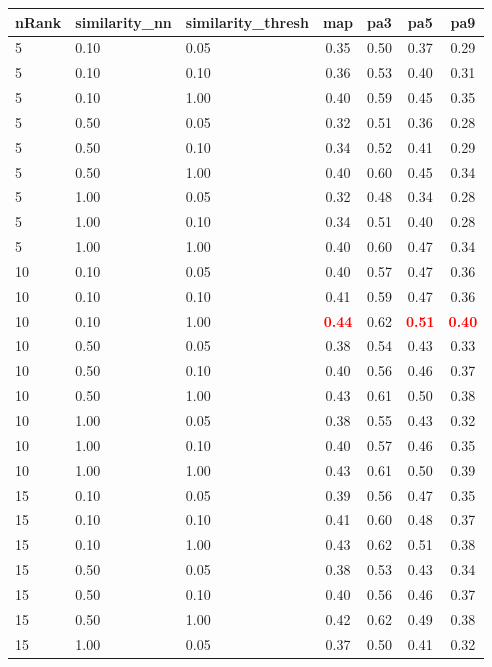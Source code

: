   
\begin{table} 
\begin{center} 
\scriptsize 
 \setlength{\tabcolsep}{.16667em} 
\begin{tabular}{lllcccc} 
nRank & similarity\_nn & similarity\_thresh & map & pa3 & pa5 & pa9 \\ 
\hline 
 5 & 0.10 & 0.05 & 0.35 & 0.50 & 0.37 & 0.29 \\ 
 5 & 0.10 & 0.10 & 0.36 & 0.53 & 0.40 & 0.31 \\ 
 5 & 0.10 & 1.00 & 0.40 & 0.59 & 0.45 & 0.35 \\ 
 5 & 0.50 & 0.05 & 0.32 & 0.51 & 0.36 & 0.28 \\ 
 5 & 0.50 & 0.10 & 0.34 & 0.52 & 0.41 & 0.29 \\ 
 5 & 0.50 & 1.00 & 0.40 & 0.60 & 0.45 & 0.34 \\ 
 5 & 1.00 & 0.05 & 0.32 & 0.48 & 0.34 & 0.28 \\ 
 5 & 1.00 & 0.10 & 0.34 & 0.51 & 0.40 & 0.28 \\ 
 5 & 1.00 & 1.00 & 0.40 & 0.60 & 0.47 & 0.34 \\ 
10 & 0.10 & 0.05 & 0.40 & 0.57 & 0.47 & 0.36 \\ 
10 & 0.10 & 0.10 & 0.41 & 0.59 & 0.47 & 0.36 \\ 
10 & 0.10 & 1.00 & \textbf{\textcolor{red}{0.44}} & 0.62 & \textbf{\textcolor{red}{0.51}} & \textbf{\textcolor{red}{0.40}} \\ 
10 & 0.50 & 0.05 & 0.38 & 0.54 & 0.43 & 0.33 \\ 
10 & 0.50 & 0.10 & 0.40 & 0.56 & 0.46 & 0.37 \\ 
10 & 0.50 & 1.00 & 0.43 & 0.61 & 0.50 & 0.38 \\ 
10 & 1.00 & 0.05 & 0.38 & 0.55 & 0.43 & 0.32 \\ 
10 & 1.00 & 0.10 & 0.40 & 0.57 & 0.46 & 0.35 \\ 
10 & 1.00 & 1.00 & 0.43 & 0.61 & 0.50 & 0.39 \\ 
15 & 0.10 & 0.05 & 0.39 & 0.56 & 0.47 & 0.35 \\ 
15 & 0.10 & 0.10 & 0.41 & 0.60 & 0.48 & 0.37 \\ 
15 & 0.10 & 1.00 & 0.43 & 0.62 & 0.51 & 0.38 \\ 
15 & 0.50 & 0.05 & 0.38 & 0.53 & 0.43 & 0.34 \\ 
15 & 0.50 & 0.10 & 0.40 & 0.56 & 0.46 & 0.37 \\ 
15 & 0.50 & 1.00 & 0.42 & 0.62 & 0.49 & 0.38 \\ 
15 & 1.00 & 0.05 & 0.37 & 0.50 & 0.41 & 0.32 \\ 

\end{tabular}
\end{center}
\end{table}
